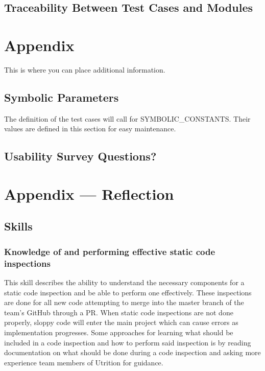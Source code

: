 \documentclass[12pt, titlepage]{article}
\begin{document}
	\subsection{Traceability Between Test Cases and Modules}
	
	
	
	
	
	
	\newpage
	
	\section{Appendix}
	
	This is where you can place additional information.
	
	\subsection{Symbolic Parameters}
	
	The definition of the test cases will call for SYMBOLIC\_CONSTANTS.
	Their values are defined in this section for easy maintenance.
	
	\subsection{Usability Survey Questions?}
	
	
	\newpage{}
	\section*{Appendix --- Reflection}
	
	\subsection*{Skills}
	\subsubsection*{Knowledge of and performing effective static code inspections}
	This skill describes the ability to understand the necessary components for a static code inspection and be able to perform one effectively. These inspections are done for all new code attempting to merge into the master branch of the team's GitHub through a PR. When static code inspections are not done properly, sloppy code will enter the main project which can cause errors as implementation progresses. Some approaches for learning what should be included in a code inspection and how to perform said inspection is by reading documentation on what should be done during a code inspection and asking more experience team members of Utrition for guidance.
	
\end{document}

